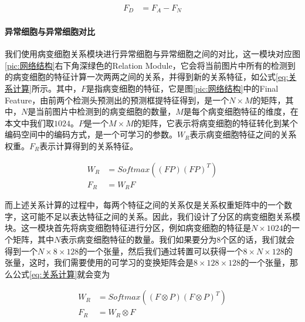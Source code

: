 \begin{equation}
    \begin{aligned}
        F_D & =F_A-F_N
    \end{aligned}
    \label{eq:差分计算}
\end{equation}

\paragraph{异常细胞与异常细胞对比}
\label{sec:异常细胞与异常细胞对比}
\par 我们使用病变细胞关系模块进行异常细胞与异常细胞之间的对比，这一模块对应图\ref{pic:网络结构}右下角深绿色的Relation Module，它会将当前图片中所有的检测到的病变细胞的特征计算一次两两之间的关系，并得到新的关系特征，如公式\ref{eq:关系计算}所示。其中，$F$是指病变细胞的特征，它是图\ref{pic:网络结构}中的Final Feature，由前两个检测头预测出的预测框提特征得到，是一个$N\times M$的矩阵，其中，$N$是当前图片中检测到的病变细胞的数量，$M$是每个病变细胞特征的维度，在本文中我们取$1024$。$P$是一个$M\times M$的矩阵，它表示将病变细胞的特征转化到某个编码空间中的编码方式，是一个可学习的参数。$W_R$表示病变细胞特征之间的关系权重。$F_R$表示计算得到的关系特征。

\begin{equation}
    \begin{aligned}
        W_R & =Softmax((FP)(FP)^T) \\
        F_R & =W_RF
    \end{aligned}
    \label{eq:关系计算}
\end{equation}

\par 而上述关系计算的过程中，每两个特征之间的关系仅是关系权重矩阵中的一个数字，这可能不足以表达特征之间的关系。因此，我们设计了分区的病变细胞关系模块。这一模块首先将病变细胞特征进行分区，例如病变细胞的特征是$N\times 1024$的一个矩阵，其中$N$表示病变细胞特征的数量。我们如果要分为$8$个区的话，我们就会得到一个$N\times 8 \times 128$的一个张量，然后我们通过转置可以获得一个$8\times N\times 128$的张量，这时，我们需要使用的可学习的变换矩阵会是$8\times 128 \times 128$的一个张量，那么公式\ref{eq:关系计算}就会变为

\begin{equation}
    \begin{aligned}
        W_R & =Softmax((F\otimes P)(F\otimes P)^T) \\
        F_R & =W_R\otimes F
    \end{aligned}
    \label{eq:分区版关系计算}
\end{equation}

